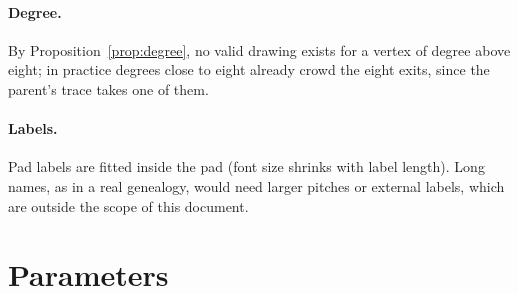 \documentclass[11pt,a4paper]{article}
\theoremstyle{remark}
\begin{document}
\paragraph{Degree.} By Proposition~\ref{prop:degree}, no valid drawing exists for a vertex of degree above eight;
in practice degrees close to eight already crowd the eight exits, since the parent's trace takes one of them.

\paragraph{Labels.} Pad labels are fitted inside the pad (font size shrinks with label length). Long names, as in a
real genealogy, would need larger pitches or external labels, which are outside the scope of this document.

\appendix
\section{Parameters}\label{app:params}
\end{document}
